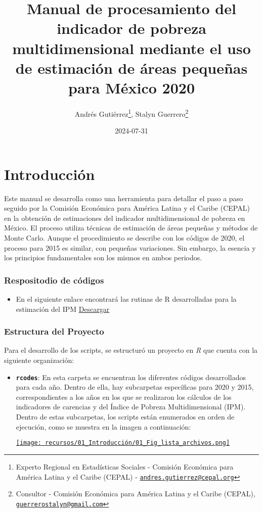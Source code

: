 \documentclass[
  12pt,
]{book}
\title{Manual de procesamiento del indicador de pobreza multidimensional mediante el uso de estimación de áreas pequeñas para México 2020}
\author{Andrés Gutiérrez\footnote{Experto Regional en Estadísticas Sociales - Comisión Económica para América Latina y el Caribe (CEPAL) - \href{mailto:andres.gutierrez@cepal.org}{\nolinkurl{andres.gutierrez@cepal.org}}}, Stalyn Guerrero\footnote{Consultor - Comisión Económica para América Latina y el Caribe (CEPAL), \href{mailto:guerrerostalyn@gmail.com}{\nolinkurl{guerrerostalyn@gmail.com}}}}
\date{2024-07-31}
\providecommand{\tightlist}{%
  \setlength{\itemsep}{0pt}\setlength{\parskip}{0pt}}
\begin{document}
\maketitle

{
\hypersetup{linkcolor=}
\setcounter{tocdepth}{0}
\tableofcontents
}
\listoffigures
\listoftables
\hypertarget{introducciuxf3n}{%
\chapter*{Introducción}\label{introducciuxf3n}}

Este manual se desarrolla como una herramienta para detallar el paso a paso seguido por la Comisión Económica para América Latina y el Caribe (CEPAL) en la obtención de estimaciones del indicador multidimensional de pobreza en México. El proceso utiliza técnicas de estimación de áreas pequeñas y métodos de Monte Carlo. Aunque el procedimiento se describe con los códigos de 2020, el proceso para 2015 es similar, con pequeñas variaciones. Sin embargo, la esencia y los principios fundamentales son los mismos en ambos periodos.

\hypertarget{respositodio-de-cuxf3digos}{%
\subsection*{Respositodio de códigos}\label{respositodio-de-cuxf3digos}}

\begin{itemize}
\tightlist
\item
  En el siguiente enlace encontrará las rutinas de R desarrolladas para la estimación del IPM \href{https://git.cepal.org/ATsae/coneval2024/-/tree/main/rcodes/2020}{Descargar}
\end{itemize}

\hypertarget{estructura-del-proyecto}{%
\subsection*{Estructura del Proyecto}\label{estructura-del-proyecto}}

Para el desarrollo de los scripts, se estructuró un proyecto en \emph{R} que cuenta con la siguiente organización:

\begin{itemize}
\item
  \textbf{\texttt{rcodes}}: En esta carpeta se encuentran los diferentes códigos desarrollados para cada año. Dentro de ella, hay subcarpetas específicas para 2020 y 2015, correspondientes a los años en los que se realizaron los cálculos de los indicadores de carencias y del Índice de Pobreza Multidimensional (IPM). Dentro de estas subcarpetas, los scripts están enumerados en orden de ejecución, como se muestra en la imagen a continuación:

  \href{fig_lista_archivo}{\texttt{[image: recursos/01\_Introducción/01\_Fig\_lista\_archivos.png]}}
\end{itemize}
\end{document}
